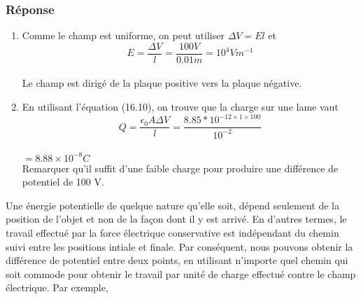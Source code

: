 \documentclass[../main.tex]{subfiles}
\begin{document}
\subsubsection{Réponse}
\begin{enumerate}
    \item Comme le champ est uniforme, on peut utiliser $\Delta V = El$ et \\
    $$E = \frac{\Delta V}{l} = \frac{100 V}{0.01 m} = 10^4 Vm^{-1}$$\\
    Le champ est dirigé de la plaque positive vers la plaque négative.
    \item En utilisant l'équation (16.10), on trouve que la charge sur une lame vaut\\
    $$Q = \frac{\epsilon_0A\Delta V}{l} = \frac{8.85*10^{-12 \times 1 \times 100}}{10^{-2}}$$
    \\
    $= 8.88 \times 10^{-8}C$\\
    Remarquer qu'il suffit d'une faible charge pour produire une différence de potentiel de 100 V.
\end{enumerate}
\par Une énergie potentielle de quelque nature qu'elle soit, dépend seulement de la position de l'objet et non de la façon dont il y est arrivé. En d'autres termes, le travail effectué par la force électrique conservative est indépendant du chemin suivi entre les positions intiale et finale. Par conséquent, nous pouvons obtenir la différence de potentiel entre deux points, en utilisant n'importe quel chemin qui soit commode pour obtenir le travail par unité de charge effectué contre le champ électrique. Par exemple, 
\end{document}
